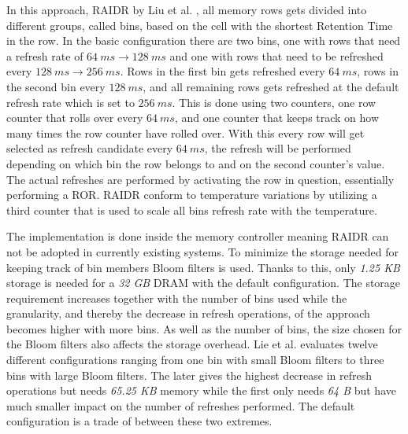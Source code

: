 In this approach, RAIDR by Liu et al. \cite{raidr}, all memory rows gets divided into different groups, called bins, based on the cell with the shortest Retention Time in the row. In the basic configuration there are two bins, one with rows that need a refresh rate of $64\:ms \to 128\:ms$ and one with rows that need to be refreshed every $128\:ms \to 256\:ms$. Rows in the first bin gets refreshed every $64\:ms$, rows in the second bin every $128\:ms$, and all remaining rows gets refreshed at the default refresh rate which is set to $256\:ms$. This is done using two counters, one row counter that rolls over every $64\:ms$, and one counter that keeps track on how many times the row counter have rolled over. With this every row will get selected as refresh candidate every $64\:ms$, the refresh will be performed depending on which bin the row belongs to and on the second counter's value. The actual refreshes are performed by activating the row in question, essentially performing a ROR. RAIDR conform to temperature variations by utilizing a third counter that is used to scale all bins refresh rate with the temperature.

The implementation is done inside the memory controller meaning RAIDR can not be adopted in currently existing systems. To minimize the storage needed for keeping track of bin members Bloom filters is used. Thanks to this, only \textit{1.25 KB} storage is needed for a \textit{32 GB} DRAM with the default configuration. The storage requirement increases together with the number of bins used while the granularity, and thereby the decrease in refresh operations, of the approach becomes higher with more bins. As well as the number of bins, the size chosen for the Bloom filters also affects the storage overhead. Lie et al. evaluates twelve different configurations ranging from one bin with small Bloom filters to three bins with large Bloom filters. The later gives the highest decrease in refresh operations but needs \textit{65.25 KB} memory while the first only needs \textit{64 B} but have much smaller impact on the number of refreshes performed. The default configuration is a trade of between these two extremes. 